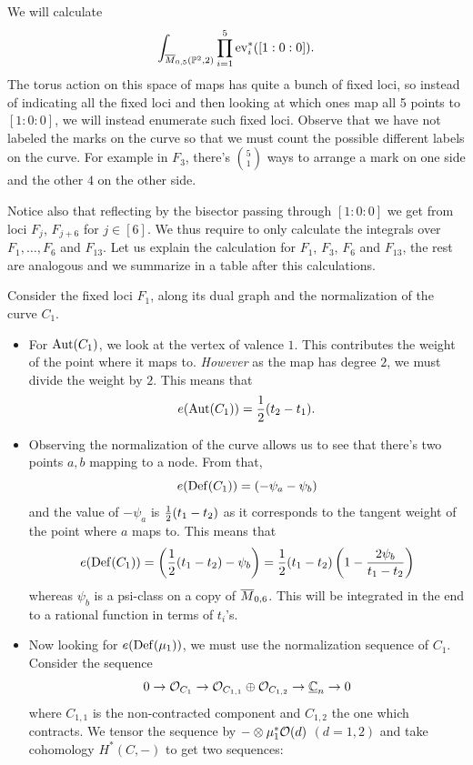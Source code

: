 \documentclass[12pt]{memoir}
\begin{document}
\begin{Ex}
We will calculate 
    $$\int_{\overline{M}_{0,5}(\mathbb{P}^2,2)}\prod_{i=1}^{5}\operatorname{ev}_i^\ast([1:0:0]).$$
    The torus action on this space of maps has quite a bunch of fixed loci, so instead of indicating all the fixed loci and then looking at which ones map all 5 points to $[1:0:0]$, we will instead enumerate such fixed loci.
    Observe that we have not labeled the marks on the curve so that we must count the possible different labels on the curve. For example in $F_3$, there's $\binom{5}{1}$ ways to arrange a mark on one side and the other $4$ on the other side.\par
    Notice also that reflecting by the bisector passing through $[1:0:0]$ we get from loci $F_j$, $F_{j+6}$ for $j\in[6]$. We thus require to only calculate the integrals over $F_1,\dots,F_6$ and $F_{13}$. Let us explain the calculation for $F_1$, $F_3$, $F_6$ and $F_{13}$, the rest are analogous and we summarize in a table after this calculations.\par
    Consider the fixed loci $F_1$, along its dual graph and the normalization of the curve $C_1$.
    \begin{itemize}
        \item For $\operatorname{Aut}(C_1)$, we look at the vertex of valence $1$. This contributes the weight of the point where it maps to. \emph{However} as the map has degree $2$, we must divide the weight by $2$. This means that 
        $$e(\Aut(C_1))=\half(t_2-t_1).$$
        \item Observing the normalization of the curve allows us to see that there's two points $a,b$ mapping to a node. From that, 
        $$e(\operatorname{Def}(C_1))=(-\psi_a-\psi_b)$$
        and the value of $-\psi_a$ is $\half(t_1-t_2)$ as it corresponds to the tangent weight of the point where $a$ maps to. This means that 
        $$e(\DefB(C_1))=\left(\half(t_1-t_2)-\psi_b\right)=\half(t_1-t_2)\left(1-\frac{2\psi_b}{t_1-t_2}\right)$$
        whereas $\psi_b$ is a psi-class on a copy of $\overline{M}_{0,6}$. This will be integrated in the end to a rational function in terms of $t_i$'s.
        \item Now looking for $e(\operatorname{Def}(\mu_1))$, we must use the normalization sequence of $C_1$. Consider the sequence 
        $$0\to\mathcal{O}_{C_1}\to\mathcal{O}_{C_{1,1}}\oplus\mathcal{O}_{C_{1,2}}\to\underline{\mathbb{C}}_{n}\to0$$
        where $C_{1,1}$ is the non-contracted component and $C_{1,2}$ the one which contracts. We tensor the sequence by $-\otimes \mu_1^\ast\mathcal{O}(d)$ $(d=1,2)$ and take cohomology $H^\ast(C,-)$ to get two sequences:

\end{itemize}
\end{Ex}
\end{document}
